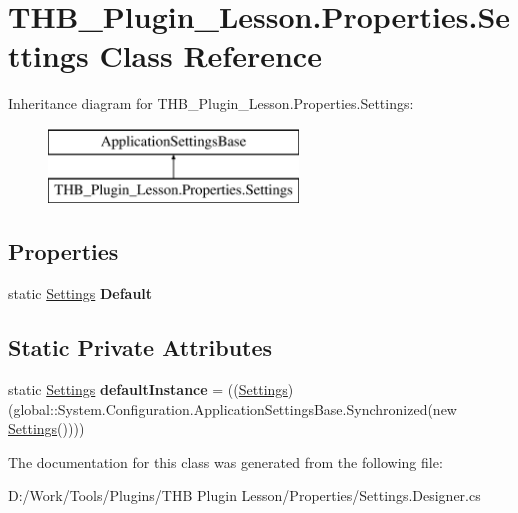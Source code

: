 \hypertarget{class_t_h_b___plugin___lesson_1_1_properties_1_1_settings}{}\section{T\+H\+B\+\_\+\+Plugin\+\_\+\+Lesson.\+Properties.\+Settings Class Reference}
\label{class_t_h_b___plugin___lesson_1_1_properties_1_1_settings}
Inheritance diagram for T\+H\+B\+\_\+\+Plugin\+\_\+\+Lesson.\+Properties.\+Settings\+:\begin{figure}[H]
\begin{center}
\leavevmode
\includegraphics[height=2.000000cm]{d2/d6c/class_t_h_b___plugin___lesson_1_1_properties_1_1_settings}
\end{center}
\end{figure}
\subsection*{Properties}
\begin{DoxyCompactItemize}
\item 
\mbox{\label{class_t_h_b___plugin___lesson_1_1_properties_1_1_settings_a62c075a5b387e28e65836510eb611744}} 
static \mbox{\hyperlink{class_t_h_b___plugin___lesson_1_1_properties_1_1_settings}{Settings}} {\bfseries Default}
\end{DoxyCompactItemize}
\subsection*{Static Private Attributes}
\begin{DoxyCompactItemize}
\item 
\mbox{\label{class_t_h_b___plugin___lesson_1_1_properties_1_1_settings_a3468ef1e17fceecd069556491bd2fd4d}} 
static \mbox{\hyperlink{class_t_h_b___plugin___lesson_1_1_properties_1_1_settings}{Settings}} {\bfseries default\+Instance} = ((\mbox{\hyperlink{class_t_h_b___plugin___lesson_1_1_properties_1_1_settings}{Settings}})(global\+::\+System.\+Configuration.\+Application\+Settings\+Base.\+Synchronized(new \mbox{\hyperlink{class_t_h_b___plugin___lesson_1_1_properties_1_1_settings}{Settings}}())))
\end{DoxyCompactItemize}


The documentation for this class was generated from the following file\+:\begin{DoxyCompactItemize}
\item 
D\+:/\+Work/\+Tools/\+Plugins/\+T\+H\+B Plugin Lesson/\+Properties/Settings.\+Designer.\+cs\end{DoxyCompactItemize}

